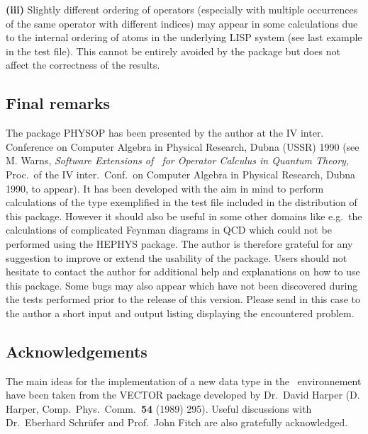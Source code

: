 {\bf (iii)} Slightly different ordering of operators (especially with
multiple occurrences of the same operator with different indices)
may appear in some calculations
due to the internal ordering of atoms in the underlying LISP system
(see last example in the test file). This cannot be entirely avoided
by the package but does not affect the correctness  of the results.


\subsection{Final remarks}
The package PHYSOP has been presented by
the author at the IV inter. Conference on Computer Algebra in Physical
Research, Dubna (USSR) 1990 (see M. Warns, {\it
Software Extensions of \REDUCE\ for Operator Calculus in Quantum Theory},
Proc.\ of the IV inter.\ Conf.\ on Computer Algebra in Physical
Research, Dubna 1990, to appear). It has been developed with the aim in
mind to perform calculations of the type exemplified in the test file
included in the distribution of this package.
However it should
also be useful in some other domains like e.g.\ the calculations of
complicated Feynman diagrams in QCD  which could not be  performed using
the HEPHYS package. The author is  therefore grateful for any
suggestion
to improve or extend the usability of the package. Users should not
hesitate to contact the author for additional help and explanations on
how to use
this package. Some bugs may also
appear which have not been discovered during the tests performed
prior to the release of this version. Please send in this case to the
author  a short
input and output listing  displaying the encountered problem.

\subsection*{Acknowledgements}
The main ideas for the implementation of a new data type in the \REDUCE\
environnement have been taken from the VECTOR package developed by
Dr.\ David Harper (D. Harper, Comp.\ Phys.\ Comm.\ {\bf 54} (1989)
295).
Useful discussions with  Dr.\ Eberhard Schr\"ufer  and
Prof.\ John Fitch are also gratefully acknowledged.


